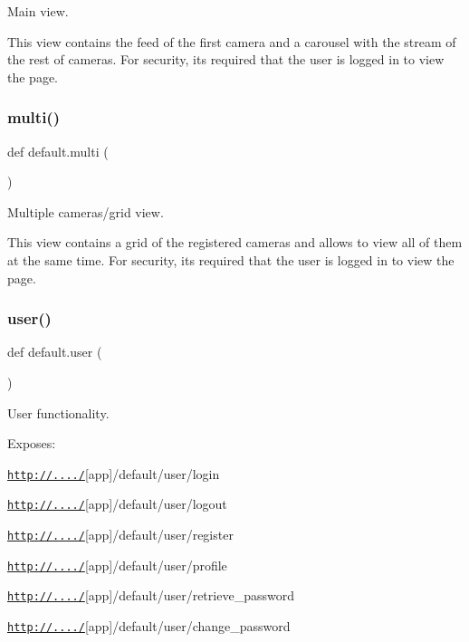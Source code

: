 Main view. 

This view contains the feed of the first camera and a carousel with the stream of the rest of cameras. For security, it\textquotesingle{}s required that the user is logged in to view the page. \mbox{\label{namespacedefault_a7cdc6aef159950a3288288d454a745b5}} 
\subsubsection{\texorpdfstring{multi()}{multi()}}
{\footnotesize\ttfamily def default.\+multi (\begin{DoxyParamCaption}{ }\end{DoxyParamCaption})}



Multiple cameras/grid view. 

This view contains a grid of the registered cameras and allows to view all of them at the same time. For security, it\textquotesingle{}s required that the user is logged in to view the page. \mbox{\label{namespacedefault_a0c38fd1bc3457394fdda416d7a956135}} 
\subsubsection{\texorpdfstring{user()}{user()}}
{\footnotesize\ttfamily def default.\+user (\begin{DoxyParamCaption}{ }\end{DoxyParamCaption})}



User functionality. 

Exposes\+:

\href{http://..../}{\tt http\+://..../}\mbox{[}app\mbox{]}/default/user/login

\href{http://..../}{\tt http\+://..../}\mbox{[}app\mbox{]}/default/user/logout

\href{http://..../}{\tt http\+://..../}\mbox{[}app\mbox{]}/default/user/register

\href{http://..../}{\tt http\+://..../}\mbox{[}app\mbox{]}/default/user/profile

\href{http://..../}{\tt http\+://..../}\mbox{[}app\mbox{]}/default/user/retrieve\+\_\+password

\href{http://..../}{\tt http\+://..../}\mbox{[}app\mbox{]}/default/user/change\+\_\+password

